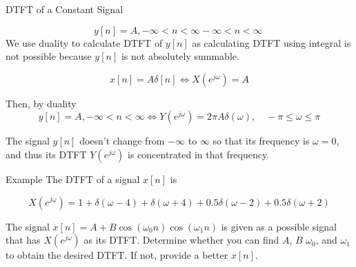 \documentclass[aspectratio=169,xcolor=dvipsnames,svgnames,x11names,fleqn]{beamer}
\begin{document}
\begin{frame}{DTFT of a Constant Signal}

$$
y[n] = A, -\infty < n < \infty -\infty < n < \infty  \
$$
We use duality to calculate DTFT of $y[n]$ as calculating DTFT using integral is not possible because $y[n]$ is not absolutely summable.

$$
x[n] = A\delta[n] \Longleftrightarrow X(e^{j\omega}) = A
$$

Then, by duality
$$
y[n] = A,-\infty < n < \infty  \Longleftrightarrow Y(e^{j\omega}) = 2\pi A\delta(\omega),\quad -\pi \leq \omega \leq \pi 
$$

The signal $y[n]$ doesn't change from $-\infty$ to $\infty$ so that its frequency is $\omega = 0$, and thus its DTFT $Y(e^{j\omega})$ is concentrated in that frequency.
\end{frame}

\begin{frame}{Example}
    The DTFT of a signal $x[n]$ is 

    $$
    X(e^{j\omega}) =  1 + \delta(\omega - 4) + \delta(\omega + 4 ) + 0.5\delta(\omega - 2) + 0.5\delta(\omega + 2)
    $$

    The signal $x[n] = A + B \cos(\omega_0 n) \cos(\omega_1n)$ is given as a possible signal that has $X(e^{j\omega})$ as its DTFT.
Determine whether you can find $A$, $B$ $\omega_0$, and $\omega_1$ to obtain the desired DTFT. If not, provide a
better $x[n]$.

\end{frame}

\begin{frame}{}
\vspace*{-9\baselineskip}
    \color{LightGray}{Blank space for calculation}
\end{frame}
\begin{frame}{}
\vspace*{-9\baselineskip}
    \color{LightGray}{Blank space for calculation}
\end{frame}
\begin{frame}{}
\vspace*{-9\baselineskip}
    \color{LightGray}{Blank space for calculation}
\end{frame}
\begin{frame}{}
\vspace*{-9\baselineskip}
    \color{LightGray}{Blank space for calculation}
\end{frame}
\begin{frame}{}
\vspace*{-9\baselineskip}
    \color{LightGray}{Blank space for calculation}
\end{frame}
\end{document}
